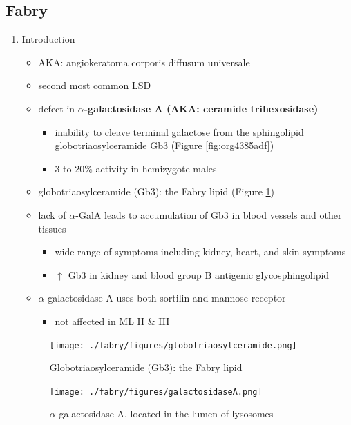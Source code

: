 \documentclass{scrartcl}
\begin{document}
\subsection{Fabry}
\label{sec:org588b8b5}
\begin{enumerate}
\item Introduction
\label{sec:org85afd3c}
\begin{itemize}
\item AKA: angiokeratoma corporis diffusum universale
\item second most common LSD
\item defect in \textbf{\(\alpha\)-galactosidase A (AKA: ceramide trihexosidase)}
\begin{itemize}
\item inability to cleave terminal galactose from the sphingolipid globotriaosylceramide Gb3 (Figure \ref{fig:org4385adf})
\item 3 to 20\% activity in hemizygote males
\end{itemize}
\item globotriaosylceramide (Gb3): the Fabry lipid (Figure \ref{fig:org5f26efb})
\item lack of \(\alpha\)-GalA leads to accumulation of Gb3 in blood vessels and other tissues
\begin{itemize}
\item wide range of symptoms including kidney, heart, and skin symptoms
\item \(\uparrow\) Gb3 in kidney and blood group B antigenic glycosphingolipid
\end{itemize}
\item \(\alpha\)-galactosidase A uses both sortilin and mannose receptor
\begin{itemize}
\item not affected in ML II \& III
\end{itemize}
\end{itemize}

\begin{figure}[htbp]
\centering
\texttt{[image: ./fabry/figures/globotriaosylceramide.png]}
\caption[Globotriaosylceramide]{\label{fig:org5f26efb}
Globotriaosylceramide (Gb3): the Fabry lipid}
\end{figure}

\begin{figure}[htbp]
\centering
\texttt{[image: ./fabry/figures/galactosidaseA.png]}
\caption[\(\alpha\)-galactosidase A]{\label{fig:org57f2ec7}
\(\alpha\)-galactosidase A, located in the lumen of lysosomes}
\end{figure}


\end{enumerate}
\end{document}
